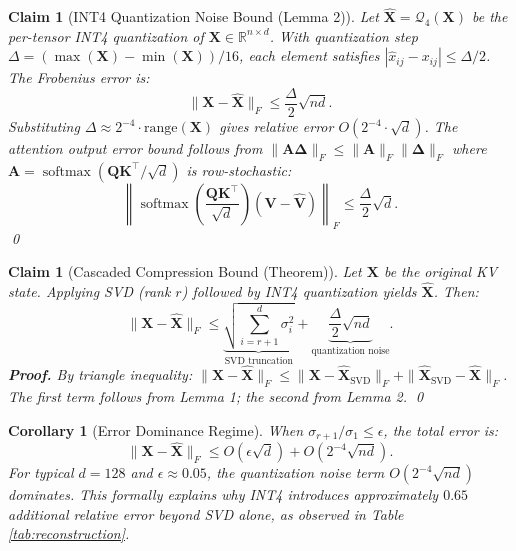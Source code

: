 \documentclass[11pt, a4paper, oneside]{article}
\newtheorem{claim}{Claim}
\theoremstyle{myplain}
\newtheorem*{claim*}{Claim}
\theoremstyle{mydefinition}
\theoremstyle{myremark}
\newtheorem*{corol}{Corollary}
\newcommand{\R}{\mathbb{R}}
\DeclareMathOperator{\softmax}{softmax}
\begin{document}
\begin{claim*}[INT4 Quantization Noise Bound (Lemma 2)]
Let $\mathbf{\hat{X}} = \mathcal{Q}_4(\mathbf{X})$ be the per-tensor INT4 quantization of $\mathbf{X} \in \R^{n \times d}$. With quantization step $\Delta = (\max(\mathbf{X}) - \min(\mathbf{X}))/16$, each element satisfies $|\hat{x}_{ij} - x_{ij}| \leq \Delta/2$. The Frobenius error is:
\begin{equation}
    \|\mathbf{X} - \mathbf{\hat{X}}\|_F \leq \frac{\Delta}{2}\sqrt{nd}.
    \tag{2}
\end{equation}
Substituting $\Delta \approx 2^{-4} \cdot \text{range}(\mathbf{X})$ gives relative error $O(2^{-4} \cdot \sqrt{d})$. The attention output error bound follows from $\|\mathbf{A}\boldsymbol{\Delta}\|_F \leq \|\mathbf{A}\|_F \|\boldsymbol{\Delta}\|_F$ where $\mathbf{A} = \softmax(\mathbf{Q}\mathbf{K}^\top/\sqrt{d})$ is row-stochastic:
\begin{equation}
    \left\| \softmax\left(\frac{\mathbf{Q}\mathbf{K}^\top}{\sqrt{d}}\right)(\mathbf{V} - \mathbf{\hat{V}})\right\|_F \leq \frac{\Delta}{2}\sqrt{d}.
    \tag{2'}
\end{equation}
\qed
\end{claim*}

\begin{claim}[Cascaded Compression Bound (Theorem)]
Let $\mathbf{X}$ be the original KV state. Applying SVD (rank $r$) followed by INT4 quantization yields $\mathbf{\hat{X}}$. Then:
\begin{equation}
    \|\mathbf{X} - \mathbf{\hat{X}}\|_F \leq \underbrace{\sqrt{\sum_{i=r+1}^{d}\sigma_i^2}}_{\text{SVD truncation}} + \underbrace{\frac{\Delta}{2}\sqrt{nd}}_{\text{quantization noise}}.
    \tag{3}
\end{equation}
\textbf{Proof.} By triangle inequality:
$\|\mathbf{X} - \mathbf{\hat{X}}\|_F \leq \|\mathbf{X} - \mathbf{\hat{X}}_{\text{SVD}}\|_F + \|\mathbf{\hat{X}}_{\text{SVD}} - \mathbf{\hat{X}}\|_F$. The first term follows from Lemma 1; the second from Lemma 2. \qed
\label{claim:cascaded_compression}
\end{claim}

\begin{corol}[Error Dominance Regime]
When $\sigma_{r+1} / \sigma_1 \leq \epsilon$, the total error is:
\[
\|\mathbf{X} - \mathbf{\hat{X}}\|_F \leq O(\epsilon\sqrt{d}) + O(2^{-4}\sqrt{nd}).
\]
For typical $d=128$ and $\epsilon \approx 0.05$, the quantization noise term $O(2^{-4}\sqrt{nd})$ dominates. This formally explains why INT4 introduces approximately $0.65$ additional relative error beyond SVD alone, as observed in Table \ref{tab:reconstruction}.
\end{corol}
\end{document}
